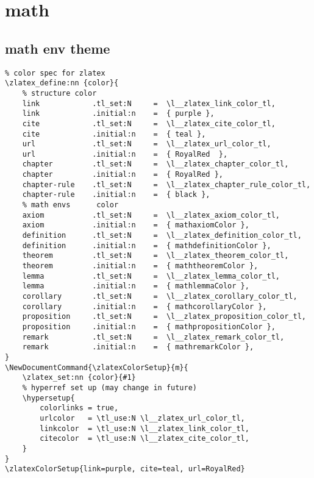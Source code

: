 \section{math}
\subsection{math env theme}
\begin{verbatim}
% color spec for zlatex
\zlatex_define:nn {color}{
    % structure color
    link            .tl_set:N     =  \l__zlatex_link_color_tl,
    link            .initial:n    =  { purple },
    cite            .tl_set:N     =  \l__zlatex_cite_color_tl,
    cite            .initial:n    =  { teal },
    url             .tl_set:N     =  \l__zlatex_url_color_tl,
    url             .initial:n    =  { RoyalRed  },
    chapter         .tl_set:N     =  \l__zlatex_chapter_color_tl,
    chapter         .initial:n    =  { RoyalRed },  
    chapter-rule    .tl_set:N     =  \l__zlatex_chapter_rule_color_tl,
    chapter-rule    .initial:n    =  { black },
    % math envs      color
    axiom           .tl_set:N     =  \l__zlatex_axiom_color_tl,
    axiom           .initial:n    =  { mathaxiomColor },
    definition      .tl_set:N     =  \l__zlatex_definition_color_tl,
    definition      .initial:n    =  { mathdefinitionColor },
    theorem         .tl_set:N     =  \l__zlatex_theorem_color_tl,
    theorem         .initial:n    =  { maththeoremColor },
    lemma           .tl_set:N     =  \l__zlatex_lemma_color_tl,
    lemma           .initial:n    =  { mathlemmaColor },
    corollary       .tl_set:N     =  \l__zlatex_corollary_color_tl,
    corollary       .initial:n    =  { mathcorollaryColor },
    proposition     .tl_set:N     =  \l__zlatex_proposition_color_tl,
    proposition     .initial:n    =  { mathpropositionColor },
    remark          .tl_set:N     =  \l__zlatex_remark_color_tl,
    remark          .initial:n    =  { mathremarkColor },
}
\NewDocumentCommand{\zlatexColorSetup}{m}{
    \zlatex_set:nn {color}{#1}
    % hyperref set up (may change in future)
    \hypersetup{
        colorlinks = true,
        urlcolor   = \tl_use:N \l__zlatex_url_color_tl,
        linkcolor  = \tl_use:N \l__zlatex_link_color_tl,
        citecolor  = \tl_use:N \l__zlatex_cite_color_tl,
    }
}
\zlatexColorSetup{link=purple, cite=teal, url=RoyalRed}
\end{verbatim}

